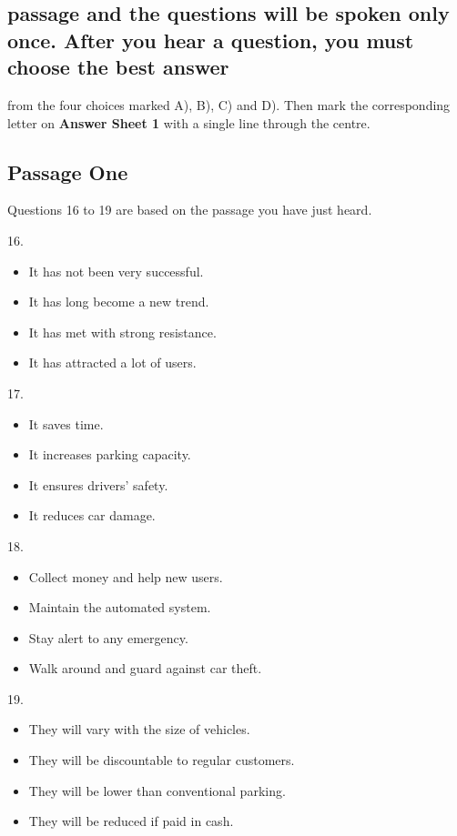 \documentclass[UTF8,11pt]{ctexart}
\begin{document}
\subsection*{passage and the questions will be spoken only once. After you hear a question, you must choose the best answer}


from the four choices marked A), B), C) and D). Then mark the corresponding letter on\textbf{ Answer Sheet 1} with a single line through the centre.


\subsection*{Passage One}


Questions 16 to 19 are based on the passage you have just heard.


16.


\begin{itemize}[leftmargin=2em,itemsep=.2em,topsep=.4em]\item[A.] It has not been very successful.
\item[B.] It has long become a new trend.
\item[C.] It has met with strong resistance.
\item[D.] It has attracted a lot of users.
\end{itemize}

17.


\begin{itemize}[leftmargin=2em,itemsep=.2em,topsep=.4em]\item[A.] It saves time.
\item[B.] It increases parking capacity.
\item[C.] It ensures drivers’ safety.
\item[D.] It reduces car damage.
\end{itemize}

18.


\begin{itemize}[leftmargin=2em,itemsep=.2em,topsep=.4em]\item[A.] Collect money and help new users.
\item[B.] Maintain the automated system.
\item[C.] Stay alert to any emergency.
\item[D.] Walk around and guard against car theft.
\end{itemize}

19.


\begin{itemize}[leftmargin=2em,itemsep=.2em,topsep=.4em]\item[A.] They will vary with the size of vehicles.
\item[B.] They will be discountable to regular customers.
\item[C.] They will be lower than conventional parking.
\item[D.] They will be reduced if paid in cash.
\end{itemize}
\end{document}
